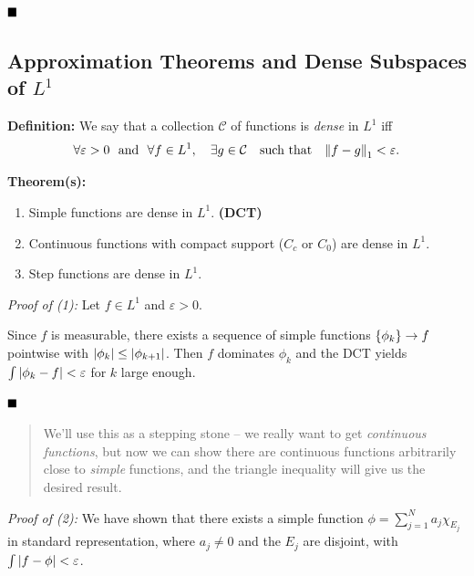 \(\qed\)

\hypertarget{approximation-theorems-and-dense-subspaces-of-l1}{%
\subsection{\texorpdfstring{Approximation Theorems and Dense Subspaces
of
\(L^1\)}{Approximation Theorems and Dense Subspaces of L\^{}1}}\label{approximation-theorems-and-dense-subspaces-of-l1}}

\textbf{Definition:} We say that a collection \(\mathcal{C}\) of
functions is \emph{dense} in \(L^1\) iff
\begin{align*}
\forall\varepsilon>0 ~\text{ and }~ \forall f\in L^1,
\quad \exists g\in\mathcal{C} 
\quad \text{such that} \quad {\left\lVert {f-g} \right\rVert}_1 < \varepsilon.
\end{align*}

\textbf{Theorem(s):}

\begin{enumerate}
\def\labelenumi{\arabic{enumi}.}
\item
  Simple functions are dense in \(L^1\). \textbf{(DCT)}
\item
  Continuous functions with compact support (\(C_c\) or \(C_0\)) are
  dense in \(L^1\).
\item
  Step functions are dense in \(L^1\).
\end{enumerate}

\emph{Proof of (1):} Let \(f\in L^1\) and \(\varepsilon > 0\).

Since \(f\) is measurable, there exists a sequence of simple functions
\(\left\{{\phi_k}\right\} \to f\) pointwise with
\({\left\lvert {\phi_k} \right\rvert} \leq {\left\lvert {\phi_{k+1}} \right\rvert}\). Then \(f\) dominates \(\phi_k\)
and the DCT yields \(\int{\left\lvert {\phi_k - f} \right\rvert} < \varepsilon\) for \(k\)
large enough.

\(\qed\)

\begin{quote}
We'll use this as a stepping stone -- we really want to get
\emph{continuous functions}, but now we can show there are continuous
functions arbitrarily close to \emph{simple} functions, and the triangle
inequality will give us the desired result.
\end{quote}

\emph{Proof of (2):} We have shown that there exists a simple function
\(\phi = \sum_{j=1}^N a_j \chi_{E_j}\) in standard representation, where
\(a_j \neq 0\) and the \(E_j\) are disjoint, with
\(\int {\left\lvert {f - \phi} \right\rvert} < \varepsilon\).

